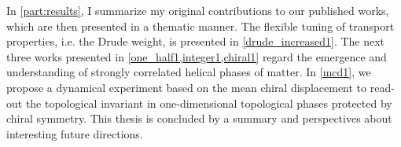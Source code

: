 In \cref{part:results}, I summarize my original contributions to our published works, which are then presented in a thematic manner.
The flexible tuning of transport properties, i.e. the Drude weight, is presented in \cref{drude_increased1}.
The next three works presented in \cref{one_half1,integer1,chiral1} regard the emergence and understanding of strongly correlated helical phases of matter.
In \cref{mcd1}, we propose a dynamical experiment based on the mean chiral displacement to read-out the topological invariant in one-dimensional topological phases protected by chiral symmetry.
This thesis is concluded by a summary and perspectives about interesting future directions.
